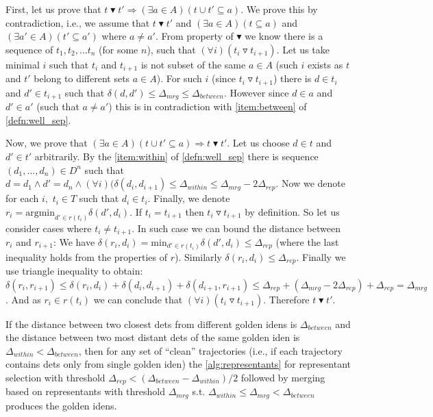 \begin{myproof}
First, let us prove that $t \blacktriangledown t' \Rightarrow (\exists a \in A) (t \cup t' \subseteq a)$. We prove this by contradiction, i.e., we assume
that $t \blacktriangledown t'$ and $(\exists a \in A) (t \subseteq a)$ and $(\exists a' \in A) (t' \subseteq a')$ where $a \neq a'$. From property of $\blacktriangledown$ we know there is a sequence of $t_1, t_2, \ldots t_n$ (for some $n$), such that $(\forall i) (t_i \triangledown t_{i+1})$. Let
us take minimal $i$ such that $t_i$ and $t_{i+1}$ is not subset of the same
$a \in A$ (such $i$ exists as $t$ and $t'$ belong to different sets $a \in A$).
For such $i$ (since $t_i \triangledown t_{i+1}$) there is $d \in t_i$ and
$d' \in t_{i+1}$ such that $\delta(d, d') \leq \Delta_{mrg} \leq \Delta_{between}$. However since $d \in a$
and $d' \in a'$ (such that $a \neq a'$) this is in contradiction with \ref{item:between} of \autoref{defn:well_sep}.

Now, we prove that $(\exists a \in A) (t \cup t' \subseteq a) \Rightarrow t \blacktriangledown t'$. Let us choose $d \in t$ and $d' \in t'$ arbitrarily. By the
\ref{item:within} of \autoref{defn:well_sep} there is sequence $(d_1, \ldots, d_n) \in D^n$
such that $d = d_1 \land d' = d_n \land (\forall i) (\delta(d_i, d_{i+1}) \leq \Delta_{within} \leq \Delta_{mrg} - 2\Delta_{rep}$. Now we denote for each $i,$ $t_i \in T$ such that
$d_i \in t_i$. Finally, we denote $r_i = \mathrm{argmin}_{d' \in r(t_i)} \delta(d', d_i)$. If $t_i = t_{i+1}$ then $t_i \triangledown t_{i+1}$ by definition.
So let us consider cases where $t_i \neq t_{i+1}$. In such case we can bound
the distance between $r_i$ and $r_{i+1}$: We have $\delta(r_i, d_i) = \mathrm{min}_{d' \in r(t_i)} \delta(d', d_i) \leq \Delta_{rep}$ (where the last inequality holds from the properties of $r$). Similarly  $\delta(r_i, d_i) \leq \Delta_{rep}$. Finally we use triangle inequality to obtain: $\delta(r_i, r_{i+1}) \leq \delta(r_i, d_i) + \delta(d_i, d_{i+1}) + \delta(d_{i+1}, r_{i+1}) \leq \Delta_{rep} + (\Delta_{mrg} - 2\Delta_{rep}) + \Delta_{rep} = \Delta_{mrg}$. And as $r_i \in r(t_i)$ we can conclude that $(\forall i) (t_i \triangledown t_{i+1})$. Therefore $t \blacktriangledown t'$.\end{myproof}


\begin{cor}
If the distance between two closest \glspl{det} from different golden
\glspl{iden} is $\Delta_{between}$ and the distance between two most distant \glspl{det}
of the same golden \gls{iden} is $\Delta_{within} < \Delta_{between}$, then for any set of ``clean''
trajectories (i.e., if each trajectory contains \glspl{det} only from single
golden \gls{iden}) the \autoref{alg:representants} for representant selection
with threshold $\Delta_{rep} < (\Delta_{between} - \Delta_{within}) / 2$ followed by merging based on representants with
threshold $\Delta_{mrg}$ s.t. $\Delta_{within} \leq \Delta_{mrg} < \Delta_{between}$ produces the golden \glspl{iden}.
\end{cor}

